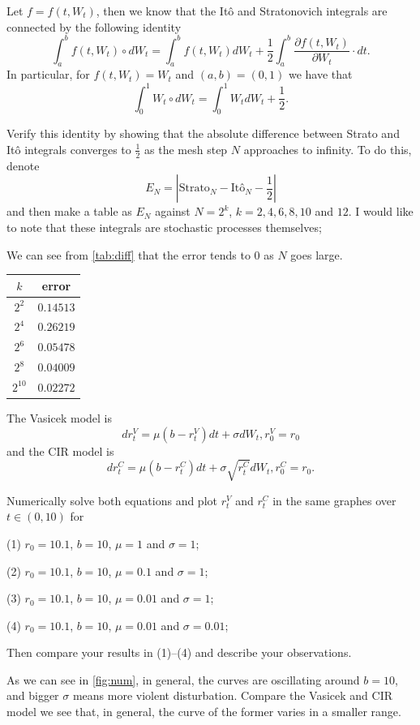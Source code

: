 \problem
\begin{question}
    Let $f=f(t,W_t)$, then we know that the It\^o and Stratonovich integrals are connected by the following identity
    \[\int_a^b f(t,W_t)\circ dW_t=\int_a^b f(t,W_t)dW_t+\frac{1}{2}\int_a^b \frac{\partial f(t,W_t)}{\partial W_t}\cdot dt.\]
    In particular, for $f(t,W_t)=W_t$ and $(a,b)=(0,1)$ we have that
    \[\int_0^1  W_t \circ dW_t=\int_0^1  W_t dW_t+\frac{1}{2}.\]

    Verify this identity by showing that the absolute difference between Strato and It\^o integrals converges to $\frac{1}{2}$ as the mesh step $N$ approaches to infinity.  To do this, denote
    \[E_N=|\text{Strato}_N-\text{It\^o}_N-\frac{1}{2}|\]
    and then make a table as $E_N$ against $N=2^k$, $k=2,4,6,8,10$ and $12$.  I would like to note that these integrals are stochastic processes themselves;
\end{question}
We can see from \cref{tab:diff} that the error tends to 0 as $N$ goes large.

\begin{margintable}
    \centering
    \begin{tabular}{cc}
        \toprule
        $k$ & error \\
        \midrule
        $2^{2}$ & $0.14513$\\
        $2^{4}$ & $0.26219$\\
        $2^{6}$ & $0.05478$\\
        $2^{8}$ & $0.04009$\\
        $2^{10}$ & $0.02272$\\
        \bottomrule
    \end{tabular}
    \caption{Difference Between It\^o and Stratonovich Integral}
    \label{tab:diff}
\end{margintable}

\problem
\begin{question}
    The Vasicek model is
    \[dr^V_t=\mu(b-r^V_t)dt+\sigma dW_t, r^V_0=r_0\]
    and the CIR model is
    \[dr^C_t=\mu(b-r^C_t)dt+\sigma \sqrt{r^C_t}dW_t, r^C_0=r_0.\]

    Numerically solve both equations and plot $r^V_t$ and $r^C_t$ in the same graphes over $t\in(0,10)$ for

    (1)  $r_0=10.1$, $b=10$, $\mu=1$ and $\sigma=1$;

    (2)  $r_0=10.1$, $b=10$, $\mu=0.1$ and $\sigma=1$;

    (3)  $r_0=10.1$, $b=10$, $\mu=0.01$ and $\sigma=1$;

    (4)  $r_0=10.1$, $b=10$, $\mu=0.01$ and $\sigma=0.01$;

    Then compare your results in (1)--(4) and describe your observations.
\end{question}
As we can see in \cref{fig:num}, in general,
the curves are oscillating around $b=10$, and bigger $\sigma$ means
more violent disturbation.
Compare the Vasicek and CIR model we see that, in general,
the curve of the former varies in a smaller range.

